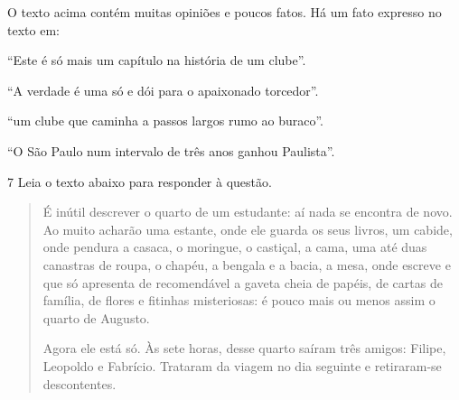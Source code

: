 
O texto acima contém muitas opiniões e poucos fatos. Há um fato
expresso no texto em:

\begin{escolha}

  \item ``Este é só mais um capítulo na história de um clube''.
  
  \item ``A verdade é uma só e dói para o apaixonado torcedor''.
  
  \item ``um clube que caminha a passos largos rumo ao buraco''.
  
  \item ``O São Paulo num intervalo de três anos ganhou Paulista''.

\end{escolha}

\num{7} Leia o texto abaixo para responder à questão.


\begin{quote}

É inútil descrever o quarto de um estudante: aí nada se
encontra de novo. Ao muito acharão uma estante, onde ele guarda
os seus livros, um cabide, onde pendura a casaca, o moringue, o
castiçal, a cama, uma até duas canastras de roupa, o chapéu, a
bengala e a bacia, a mesa, onde escreve e que só apresenta de
recomendável a gaveta cheia de papéis, de cartas de família, de
flores e fitinhas misteriosas: é pouco mais ou menos assim o
quarto de Augusto.

Agora ele está só. Às sete horas, desse quarto saíram três
amigos: Filipe, Leopoldo e Fabrício. Trataram da viagem no dia 
seguinte e retiraram-se descontentes.

\end{quote}



